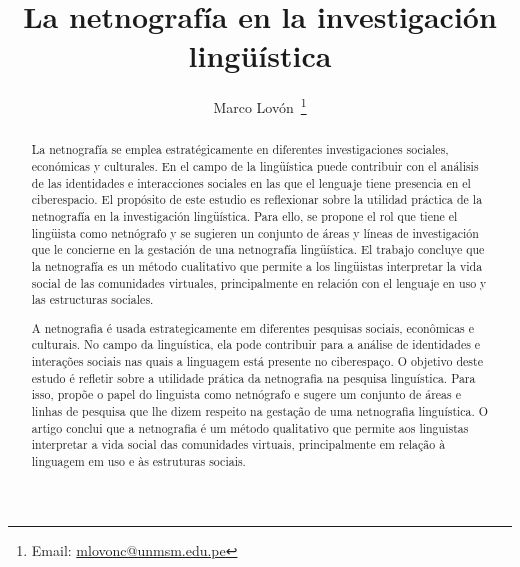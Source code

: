 \documentclass[spanish]{textolivre}
\title{La netnografía en la investigación lingüística}
\author[1]{Marco Lovón~\orcid{0000-0002-9182-6072}\thanks{Email: \href{mailto:mlovonc@unmsm.edu.pe}{mlovonc@unmsm.edu.pe}}}
\affil[1]{Universidad Nacional Mayor de San Marcos, Lima, Perú.}
\begin{document}
\maketitle
\begin{polyabstract}

\begin{spanish}
\begin{abstract}
 La netnografía se emplea estratégicamente en diferentes investigaciones sociales, económicas y culturales. En el campo de la lingüística puede contribuir con el análisis de las identidades e interacciones sociales en las que el lenguaje tiene presencia en el ciberespacio. El propósito de este estudio es reflexionar sobre la utilidad práctica de la netnografía en la investigación lingüística. Para ello, se propone el rol que tiene el lingüista como netnógrafo y se sugieren un conjunto de áreas y líneas de investigación que le concierne en la gestación de una netnografía lingüística. El trabajo concluye que la netnografía es un método cualitativo que permite a los lingüistas interpretar la vida social de las comunidades virtuales, principalmente en relación con el lenguaje en uso y las estructuras sociales.  

\end{abstract}
\end{spanish}

\begin{portuguese}
\begin{abstract}
    A netnografia é usada estrategicamente em diferentes pesquisas sociais, econômicas e culturais. No campo da linguística, ela pode contribuir para a análise de identidades e interações sociais nas quais a linguagem está presente no ciberespaço. O objetivo deste estudo é refletir sobre a utilidade prática da netnografia na pesquisa linguística. Para isso, propõe o papel do linguista como netnógrafo e sugere um conjunto de áreas e linhas de pesquisa que lhe dizem respeito na gestação de uma netnografia linguística. O artigo conclui que a netnografia é um método qualitativo que permite aos linguistas interpretar a vida social das comunidades virtuais, principalmente em relação à linguagem em uso e às estruturas sociais.      
\end{abstract}
\end{portuguese}


\end{polyabstract}
\end{document}
